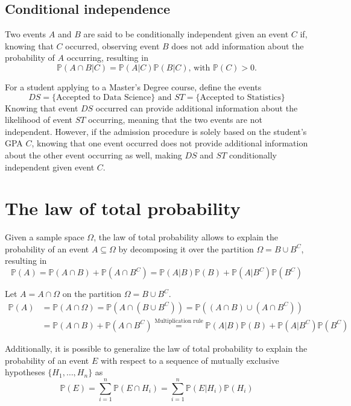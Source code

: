 \documentclass{report}
\begin{document}
\subsection{Conditional independence}
Two events $\displaystyle A$ and $\displaystyle B$ are said to be conditionally independent given an event $\displaystyle C$ if, knowing that $\displaystyle C$ occurred, observing event $\displaystyle B$ does not add information about the probability of $\displaystyle A$ occurring, resulting in
\[\mathbb{P}(A \cap B|C) = \mathbb{P}(A|C)\mathbb{P}(B|C) \text{, with $\mathbb{P}(C) > 0$.}\]
\begin{examplebox}
    For a student applying to a Master's Degree course, define the events
    \[DS = \{\text{Accepted to Data Science}\} \text{ and } ST = \{\text{Accepted to Statistics}\}\]
    Knowing that event $\displaystyle DS$ occurred can provide additional information about the likelihood of event $\displaystyle ST$ occurring, meaning that the two events are not independent. \newline
    However, if the admission procedure is solely based on the student's GPA $\displaystyle C$, knowing that one event occurred does not provide additional information about the other event occurring as well, making $\displaystyle DS$ and $\displaystyle ST$ conditionally independent given event $\displaystyle C$.
\end{examplebox}
\section{The law of total probability}
Given a sample space $\displaystyle \Omega$, the law of total probability allows to explain the probability of an event $\displaystyle A \subseteq \Omega$ by decomposing it over the partition $\displaystyle \Omega = B \cup B^C$, resulting in
\[\mathbb{P}(A) = \mathbb{P}(A \cap B) + \mathbb{P}(A \cap B^C) = \mathbb{P}(A|B)\mathbb{P}(B) + \mathbb{P}(A|B^C)\mathbb{P}(B^C)\]
\begin{proofbox}
    Let $\displaystyle A = A \cap \Omega$ on the partition $\displaystyle \Omega = B \cup B^C$.
    \begin{align*}
        \mathbb{P}(A)
            &= \mathbb{P}(A \cap \Omega) = \mathbb{P}(A \cap (B \cup B^C)) = \mathbb{P}((A \cap B) \cup (A \cap B^C)) \\
            &= \mathbb{P}(A \cap B) + \mathbb{P}(A \cap B^C) \stackrel{\text{Multiplication rule}}{=} \mathbb{P}(A|B)\mathbb{P}(B) + \mathbb{P}(A|B^C)\mathbb{P}(B^C)
    \end{align*}
\end{proofbox}
\noindent Additionally, it is possible to generalize the law of total probability to explain the probability of an event $\displaystyle E$ with respect to a sequence of mutually exclusive hypotheses $\displaystyle \{H_1, \dots, H_n\}$ as
\[\mathbb{P}(E) = \sum_{i = 1}^n \mathbb{P}(E \cap H_i) = \sum_{i = 1}^n \mathbb{P}(E|H_i)\mathbb{P}(H_i)\]
\end{document}
